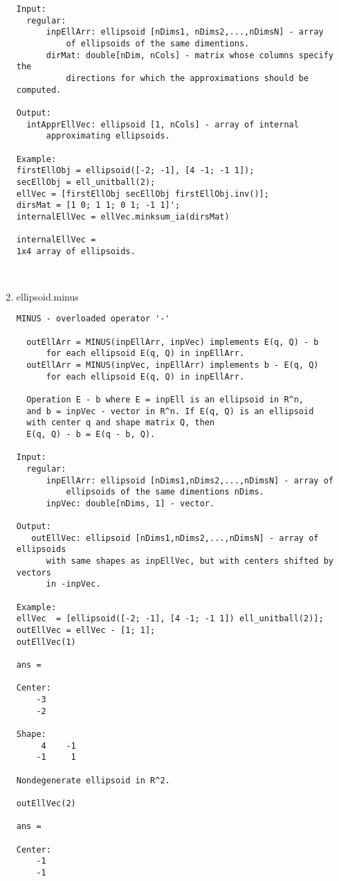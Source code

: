 \begin{enumerate}
\begin{lstlisting}
Input:
  regular:
      inpEllArr: ellipsoid [nDims1, nDims2,...,nDimsN] - array
          of ellipsoids of the same dimentions.
      dirMat: double[nDim, nCols] - matrix whose columns specify the
          directions for which the approximations should be computed.

Output:
  intApprEllVec: ellipsoid [1, nCols] - array of internal
      approximating ellipsoids.

Example:
firstEllObj = ellipsoid([-2; -1], [4 -1; -1 1]);
secEllObj = ell_unitball(2);
ellVec = [firstEllObj secEllObj firstEllObj.inv()];
dirsMat = [1 0; 1 1; 0 1; -1 1]';
internalEllVec = ellVec.minksum_ia(dirsMat)

internalEllVec =
1x4 array of ellipsoids.



\end{lstlisting}
\fontfamily{\familydefault}
\selectfont
\item {ellipsoid.minus}
\selectfont
\begin{lstlisting}
MINUS - overloaded operator '-'

  outEllArr = MINUS(inpEllArr, inpVec) implements E(q, Q) - b
      for each ellipsoid E(q, Q) in inpEllArr.
  outEllArr = MINUS(inpVec, inpEllArr) implements b - E(q, Q)
      for each ellipsoid E(q, Q) in inpEllArr.

  Operation E - b where E = inpEll is an ellipsoid in R^n,
  and b = inpVec - vector in R^n. If E(q, Q) is an ellipsoid
  with center q and shape matrix Q, then
  E(q, Q) - b = E(q - b, Q).

Input:
  regular:
      inpEllArr: ellipsoid [nDims1,nDims2,...,nDimsN] - array of
          ellipsoids of the same dimentions nDims.
      inpVec: double[nDims, 1] - vector.

Output:
   outEllVec: ellipsoid [nDims1,nDims2,...,nDimsN] - array of ellipsoids
      with same shapes as inpEllVec, but with centers shifted by vectors
      in -inpVec.

Example:
ellVec  = [ellipsoid([-2; -1], [4 -1; -1 1]) ell_unitball(2)];
outEllVec = ellVec - [1; 1];
outEllVec(1)

ans =

Center:
    -3
    -2

Shape:
     4    -1
    -1     1

Nondegenerate ellipsoid in R^2.

outEllVec(2)

ans =

Center:
    -1
    -1


\end{lstlisting}
\end{enumerate}
